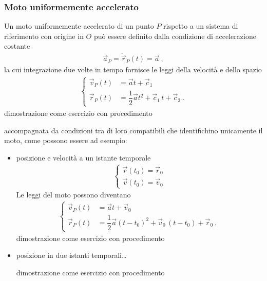 \documentclass[letterpaper,10pt,italian]{jupyterBook}
\begin{document}
\subsubsection{Moto uniformemente accelerato}
\label{\detokenize{ch/mechanics/kinematics-point:moto-uniformemente-accelerato}}
\sphinxAtStartPar
Un moto uniformemente accelerato di un punto \(P\) rispetto a un sistema di riferimento con origine in \(O\) può essere definito dalla condizione di accelerazione costante
\begin{equation*}
\begin{split}\vec{a}_P = \ddot{\vec{r}}_P(t) = \vec{a} \ ,\end{split}
\end{equation*}
\sphinxAtStartPar
la cui integrazione due volte in tempo fornisce le leggi della velocità e dello spazio
\begin{equation*}
\begin{split}\begin{cases}
  \vec{v}_P(t) & = \vec{a} t               + \vec{c}_1 \\
  \vec{r}_P(t) & = \dfrac{1}{2}\vec{a} t^2 + \vec{c}_1 \, t + \vec{c}_2 \ .
\end{cases}\end{split}
\end{equation*}
\sphinxAtStartPar
{} dimostrazione come esercizio con procedimento

\sphinxAtStartPar
accompagnata da condizioni tra di loro compatibili che identifichino unicamente il moto, come possono essere ad esempio:
\begin{itemize}
\item {} 
\sphinxAtStartPar
posizione e velocità a un istante temporale
\begin{equation*}
\begin{split}\begin{cases}
    \vec{r}(t_0) = \vec{r}_0 \\
    \vec{v}(t_0) = \vec{v}_0
  \end{cases}\end{split}
\end{equation*}
\sphinxAtStartPar
Le leggi del moto possono diventano
\begin{equation*}
\begin{split}\begin{cases}
    \vec{v}_P(t) & = \vec{a} t                     + \vec{v}_0  \\
    \vec{r}_P(t) & = \dfrac{1}{2}\vec{a} (t-t_0)^2 + \vec{v}_0 \, ( t - t_0 ) + \vec{r}_0 \ ,
  \end{cases}\end{split}
\end{equation*}
\sphinxAtStartPar
{} dimostrazione come esercizio con procedimento

\item {} 
\sphinxAtStartPar
posizione in due istanti temporali… 

\sphinxAtStartPar
{} dimostrazione come esercizio con procedimento

\end{itemize}
\end{document}
